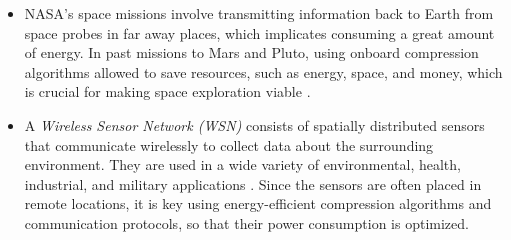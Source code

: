 \begin{itemize}
\item NASA's space missions involve transmitting information back to Earth from space probes in far away places, which implicates consuming a great amount of energy. In past missions to Mars and Pluto, using onboard compression algorithms allowed to save resources, such as energy, space, and money, which is crucial for making space exploration viable \cite{HPMars, Pluto}.

\item A \textit{Wireless Sensor Network (WSN)} consists of spatially distributed sensors that communicate wirelessly to collect data about the surrounding environment. They are used in a wide variety of environmental, health, industrial, and military applications \cite{WSNWiley, WSNList}. Since the sensors are often placed in remote locations, it is key using energy-efficient compression algorithms and communication protocols, so that their power consumption is optimized.
\end{itemize}


\newcommand{\footExampleOne}{\footnote{In general, lossless compression is recommended for archival purposes, while lossy compression is suggested to optimize the bandwidth usage when transmitting data.}}
\newcommand{\footExampleTwo}{\footnote{In general, compression algorithms executed in a battery-run device tend to have low computational complexity, so that a small amount of energy is consumed during the compression process.}}
\newcommand{\footSampling}{\footnote{In the context of WSNs, we consider that each sensor, which records data corresponding to a single signal, represents a different channel.}}



